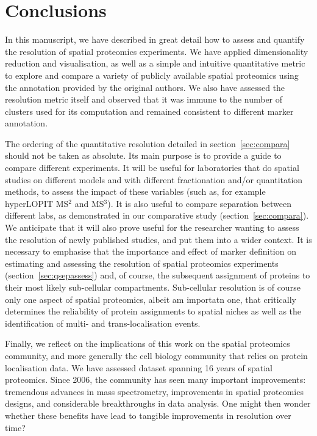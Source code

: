 \documentclass[12pt]{article}\usepackage[]{graphicx}\usepackage[]{color}
\begin{document}
\section{Conclusions}

In this manuscript, we have described in great detail how to assess
and quantify the resolution of spatial proteomics experiments. We have
applied dimensionality reduction and visualisation, as well as a
simple and intuitive quantitative metric to explore and compare a
variety of publicly available spatial proteomics using the annotation
provided by the original authors. We also have assessed the resolution
metric itself and observed that it was immune to the number of
clusters used for its computation and remained consistent to different
marker annotation.

The ordering of the quantitative resolution detailed in
section~\ref{sec:compara} should not be taken as absolute. Its main
purpose is to provide a guide to compare different experiments. It
will be useful for laboratories that do spatial studies on different
models and with different fractionation and/or quantitation methods,
to assess the impact of these variables (such as, for example
hyperLOPIT MS$^2$ and MS$^3$). It is also useful to compare separation
between different labs, as demonstrated in our comparative study
(section~\ref{sec:compara}). We anticipate that it will also prove
useful for the researcher wanting to assess the resolution of newly
published studies, and put them into a wider context. It is necessary
to emphasise that the importance and effect of marker definition on
estimating and assessing the resolution of spatial proteomics
experiments (section~\ref{sec:qsepassess}) and, of course, the
subsequent assignment of proteins to their most likely sub-cellular
compartments. Sub-cellular resolution is of course only one aspect of
spatial proteomics, albeit am importatn one, that critically
determines the reliability of protein assignments to spatial niches as
well as the identification of multi- and trans-localisation events.

\bigskip

Finally, we reflect on the implications of this work on the spatial
proteomics community, and more generally the cell biology community
that relies on protein localisation data. We have assessed dataset
spanning 16 years of spatial proteomics. Since 2006, the community has
seen many important improvements: tremendous advances in mass
spectrometry, improvements in spatial proteomics designs, and
considerable breakthroughs in data analysis. One might then wonder
whether these benefits have lead to tangible improvements in
resolution over time?
\end{document}
